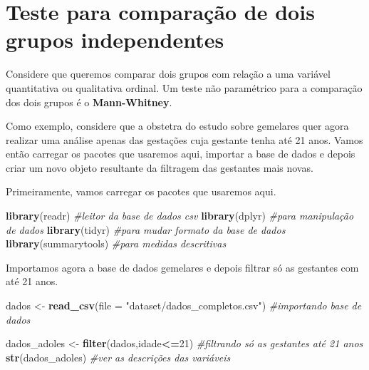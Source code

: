 \documentclass[
]{book}
\newenvironment{Shaded}{\begin{snugshade}}{\end{snugshade}}
\newcommand{\CommentTok}[1]{\textcolor[rgb]{0.56,0.35,0.01}{\textit{#1}}}
\newcommand{\DataTypeTok}[1]{\textcolor[rgb]{0.13,0.29,0.53}{#1}}
\newcommand{\DecValTok}[1]{\textcolor[rgb]{0.00,0.00,0.81}{#1}}
\newcommand{\KeywordTok}[1]{\textcolor[rgb]{0.13,0.29,0.53}{\textbf{#1}}}
\newcommand{\NormalTok}[1]{#1}
\newcommand{\OperatorTok}[1]{\textcolor[rgb]{0.81,0.36,0.00}{\textbf{#1}}}
\newcommand{\StringTok}[1]{\textcolor[rgb]{0.31,0.60,0.02}{#1}}
\begin{document}
\hypertarget{teste-para-comparauxe7uxe3o-de-dois-grupos-independentes}{%
\section{Teste para comparação de dois grupos independentes}\label{teste-para-comparauxe7uxe3o-de-dois-grupos-independentes}}

Considere que queremos comparar dois grupos com relação a uma variável quantitativa ou qualitativa ordinal. Um teste não paramétrico para a comparação dos dois grupos é o \textbf{Mann-Whitney}.

Como exemplo, considere que a obstetra do estudo sobre gemelares quer agora realizar uma análise apenas das gestações cuja gestante tenha até 21 anos. Vamos então carregar os pacotes que usaremos aqui, importar a base de dados e depois criar um novo objeto resultante da filtragem das gestantes mais novas.

Primeiramente, vamos carregar os pacotes que usaremos aqui.

\begin{Shaded}
\begin{Highlighting}[]
\KeywordTok{library}\NormalTok{(readr) }\CommentTok{#leitor da base de dados csv}
\KeywordTok{library}\NormalTok{(dplyr) }\CommentTok{#para manipulação de dados}
\KeywordTok{library}\NormalTok{(tidyr) }\CommentTok{#para mudar formato da base de dados}
\KeywordTok{library}\NormalTok{(summarytools) }\CommentTok{#para medidas descritivas}
\end{Highlighting}
\end{Shaded}

Importamos agora a base de dados gemelares e depois filtrar só as gestantes com até 21 anos.

\begin{Shaded}
\begin{Highlighting}[]
\NormalTok{dados <-}\StringTok{ }\KeywordTok{read_csv}\NormalTok{(}\DataTypeTok{file =} \StringTok{"dataset/dados_completos.csv"}\NormalTok{) }\CommentTok{#importando base de dados}

\NormalTok{dados_adoles <-}\StringTok{ }\KeywordTok{filter}\NormalTok{(dados,idade}\OperatorTok{<=}\DecValTok{21}\NormalTok{) }\CommentTok{#filtrando só as gestantes até 21 anos}
\KeywordTok{str}\NormalTok{(dados_adoles) }\CommentTok{#ver as descrições das variáveis}
\end{Highlighting}
\end{Shaded}
\end{document}
